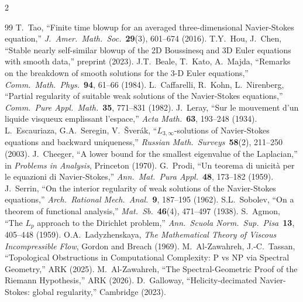 \documentclass[10pt]{article}
\begin{document}
\begin{multicols}{2}
\begin{thebibliography}{99}
\footnotesize
{} T.\ Tao, ``Finite time blowup for an averaged three-dimensional Navier-Stokes equation,'' \textit{J.\ Amer.\ Math.\ Soc.}\ \textbf{29}(3), 601--674 (2016).
 T.Y.\ Hou, J.\ Chen, ``Stable nearly self-similar blowup of the 2D Boussinesq and 3D Euler equations with smooth data,'' preprint (2023).
 J.T.\ Beale, T.\ Kato, A.\ Majda, ``Remarks on the breakdown of smooth solutions for the 3-D Euler equations,'' \textit{Comm.\ Math.\ Phys.}\ \textbf{94}, 61--66 (1984).
 L.\ Caffarelli, R.\ Kohn, L.\ Nirenberg, ``Partial regularity of suitable weak solutions of the Navier-Stokes equations,'' \textit{Comm.\ Pure Appl.\ Math.}\ \textbf{35}, 771--831 (1982).
 J.\ Leray, ``Sur le mouvement d'un liquide visqueux emplissant l'espace,'' \textit{Acta Math.}\ \textbf{63}, 193--248 (1934).
 L.\ Escauriaza, G.A.\ Seregin, V.\ \v{S}ver\'ak, ``$L_{3,\infty}$-solutions of Navier-Stokes equations and backward uniqueness,'' \textit{Russian Math.\ Surveys}\ \textbf{58}(2), 211--250 (2003).
 J.\ Cheeger, ``A lower bound for the smallest eigenvalue of the Laplacian,'' in \textit{Problems in Analysis}, Princeton (1970).
 G.\ Prodi, ``Un teorema di unicit\`a per le equazioni di Navier-Stokes,'' \textit{Ann.\ Mat.\ Pura Appl.}\ \textbf{48}, 173--182 (1959). J.\ Serrin, ``On the interior regularity of weak solutions of the Navier-Stokes equations,'' \textit{Arch.\ Rational Mech.\ Anal.}\ \textbf{9}, 187--195 (1962).
 S.L.\ Sobolev, ``On a theorem of functional analysis,'' \textit{Mat.\ Sb.}\ \textbf{46}(4), 471--497 (1938).
 S.\ Agmon, ``The $L_p$ approach to the Dirichlet problem,'' \textit{Ann.\ Scuola Norm.\ Sup.\ Pisa}\ \textbf{13}, 405--448 (1959).
 O.A.\ Ladyzhenskaya, \textit{The Mathematical Theory of Viscous Incompressible Flow}, Gordon and Breach (1969).
 M.\ Al-Zawahreh, J.-C.\ Tassan, ``Topological Obstructions in Computational Complexity: P vs NP via Spectral Geometry,'' ARK (2025).
 M.\ Al-Zawahreh, ``The Spectral-Geometric Proof of the Riemann Hypothesis,'' ARK (2026).
 D.\ Galloway, ``Helicity-decimated Navier-Stokes: global regularity,'' Cambridge (2023).
\end{thebibliography}

\end{multicols}
\end{document}
